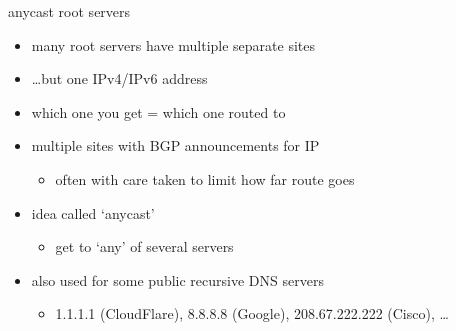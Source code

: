 \begin{frame}{anycast root servers}
    \begin{itemize}
    \item many root servers have multiple separate sites
    \item \ldots but one IPv4/IPv6 address
    \vspace{.5cm}
    \item which one you get = which one routed to
    \item multiple sites with BGP announcements for IP
        \begin{itemize}
        \item often with care taken to limit how far route goes
        \end{itemize}
    \item idea called `anycast'
        \begin{itemize}
        \item get to `any' of several servers
        \end{itemize}
    \item also used for some public recursive DNS servers
        \begin{itemize}
        \item 1.1.1.1 (CloudFlare), 8.8.8.8 (Google), 208.67.222.222 (Cisco), \ldots
        \end{itemize}
    \end{itemize}
\end{frame}
